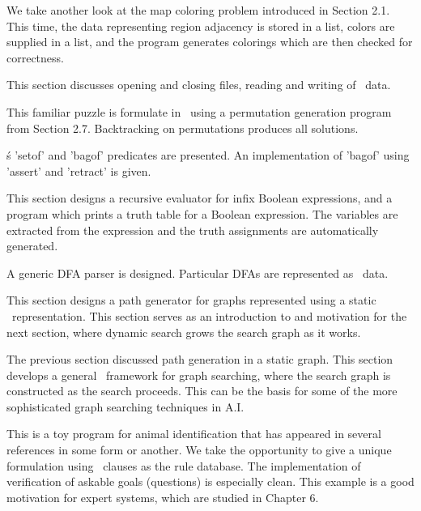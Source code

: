 
We take another look at the map coloring problem introduced in Section 2.1. This
time, the data representing region adjacency is stored in a list, colors are
supplied in a list, and the program generates colorings which are then checked
for correctness.


This section discusses opening and closing files, reading and writing of \prolog\
data.
 

This familiar puzzle is formulate in \prolog\ using a permutation generation
program from Section 2.7. Backtracking on permutations produces all solutions.
 

\prolog\'s 'setof' and 'bagof' predicates are presented. An implementation of
'bagof' using 'assert' and 'retract' is given.


This section designs a recursive evaluator for infix Boolean expressions, and a
program which prints a truth table for a Boolean expression. The variables are
extracted from the expression and the truth assignments are automatically
generated.


A generic DFA parser is designed. Particular DFAs are represented as \prolog\
data.
 

This section designs a path generator for graphs represented using a static
\prolog\ representation. This section serves as an introduction to and motivation
for the next section, where dynamic search grows the search graph as it works.
 
\secrel{2.16 Search} 

The previous section discussed path generation in a static graph. This section
develops a general \prolog\ framework for graph searching, where the search graph
is constructed as the search proceeds. This can be the basis for some of the
more sophisticated graph searching techniques in A.I.


This is a toy program for animal identification that has appeared in several
references in some form or another. We take the opportunity to give a unique
formulation using \prolog\ clauses as the rule database. The implementation of
verification of askable goals (questions) is especially clean. This example is a
good motivation for expert systems, which are studied in Chapter 6.

